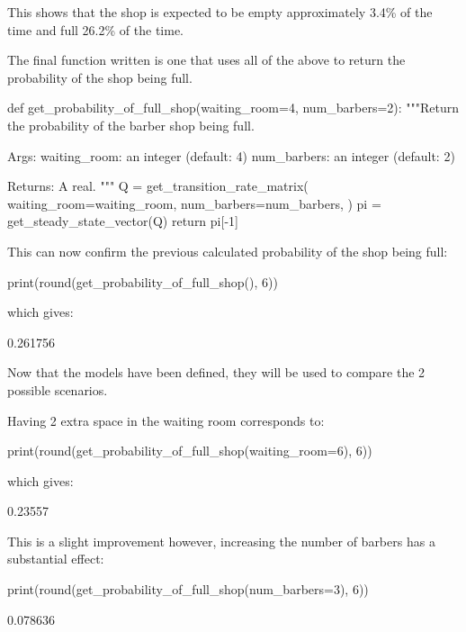 This shows that the shop is expected to be empty approximately 3.4\% of the time
and full 26.2\% of the time.

The final function written is one that uses all of
the above to return the probability of the shop being full.

\begin{pyin}
def get_probability_of_full_shop(waiting_room=4, num_barbers=2):
    """Return the probability of the barber shop being full.

    Args:
        waiting_room: an integer (default: 4)
        num_barbers: an integer (default: 2)

    Returns:
        A real.
    """
    Q = get_transition_rate_matrix(
        waiting_room=waiting_room,
        num_barbers=num_barbers,
    )
    pi = get_steady_state_vector(Q)
    return pi[-1]
\end{pyin}

This can now confirm the previous calculated probability of the shop
being full:

\begin{pyin}
print(round(get_probability_of_full_shop(), 6))
\end{pyin}

which gives:

\begin{pyout}
0.261756
\end{pyout}

Now that the models have been defined, they will be used to compare the 2
possible scenarios.

Having 2 extra space in the waiting room corresponds to:

\begin{pyin}
print(round(get_probability_of_full_shop(waiting_room=6), 6))
\end{pyin}

which gives:

\begin{pyout}
0.23557
\end{pyout}

This is a slight improvement however, increasing the number of barbers has a
substantial effect:

\begin{pyin}
print(round(get_probability_of_full_shop(num_barbers=3), 6))
\end{pyin}

\begin{pyout}
0.078636
\end{pyout}

